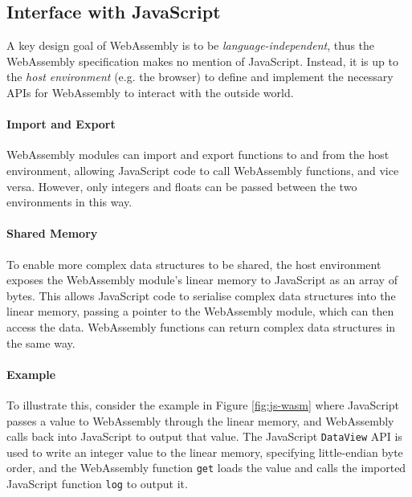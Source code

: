\subsection{Interface with JavaScript}

A key design goal of WebAssembly is to be \emph{language-independent}, thus the WebAssembly specification makes no mention of JavaScript. Instead, it is up to the \emph{host environment} (e.g. the browser) to define and implement the necessary APIs for WebAssembly to interact with the outside world.

\paragraph{Import and Export} WebAssembly modules can import and export functions to and from the host environment, allowing JavaScript code to call WebAssembly functions, and vice versa. However, only integers and floats can be passed between the two environments in this way.

\paragraph{Shared Memory} To enable more complex data structures to be shared, the host environment exposes the WebAssembly module's linear memory to JavaScript as an array of bytes. This allows JavaScript code to serialise complex data structures into the linear memory, passing a pointer to the WebAssembly module, which can then access the data. WebAssembly functions can return complex data structures in the same way.

\paragraph{Example} To illustrate this, consider the example in Figure \ref{fig:js-wasm} where JavaScript passes a value to WebAssembly through the linear memory, and WebAssembly calls back into JavaScript to output that value. The JavaScript \texttt{DataView} API is used to write an integer value to the linear memory, specifying little-endian byte order, and the WebAssembly function \texttt{get} loads the value and calls the imported JavaScript function \texttt{log} to output it.

